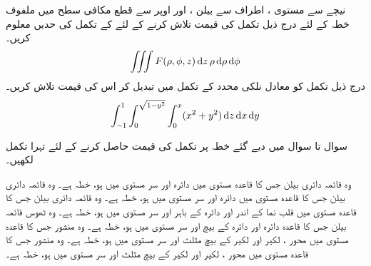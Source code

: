 نیچے سے مستوی ،  اطراف سے بیلن ، اور اوپر سے قطع مکافی سطح  میں ملفوف خطہ  کے لئے درج ذیل تکمل کی قیمت تلاش کرنے کے لئے  کے تکمل کی  حدیں معلوم کریں۔
\begin{align*}
\iiint F(\rho,\phi,z)\dif z\,\rho \dif \rho\dif\phi
\end{align*}
درج ذیل تکمل کو معادل نلکی محدد کے تکمل میں تبدیل کر  اس کی قیمت تلاش کریں۔
\begin{align*}
\int_{-1}^1 \int_0^{\sqrt{1-y^2}}\int_0^x (x^2+y^2)\dif z\dif x\dif y
\end{align*}

سوال  تا سوال   میں دیے گئے خطہ  پر تکمل  کی قیمت حاصل کرنے کے لئے تہرا تکمل لکھیں۔

وہ     قائمہ دائری بیلن جس کا  قاعدہ  مستوی  میں  دائرہ   اور  سر   مستوی میں  ہو، خطہ  ہے۔
وہ   قائمہ دائری بیلن جس کا  قاعدہ  مستوی  میں  دائرہ   اور  سر   مستوی  میں   ہو، خطہ  ہے۔
وہ  قائمہ دائری بیلن جس کا  قاعدہ  مستوی  میں  قلب نما   کے اندر  اور دائرہ  کے باہر  اور سر  مستوی  میں   ہو، خطہ  ہے۔
وہ ٹھوس قائمہ بیلن جس کا  قاعدہ دائرہ  اور دائرہ  کے بیچ اور سر مستوی  میں ہو،  خطہ  ہے۔
وہ منشور جس کا قاعدہ مستوی  میں  محور ،  لکیر  اور لکیر  کے بیچ  مثلث   اور  سر مستوی  میں ہو، خطہ  ہے۔
وہ منشور جس کا قاعدہ مستوی  میں  محور ،  لکیر  اور لکیر  کے بیچ  مثلث  اور  سر مستوی  میں ہو، خطہ  ہے۔

